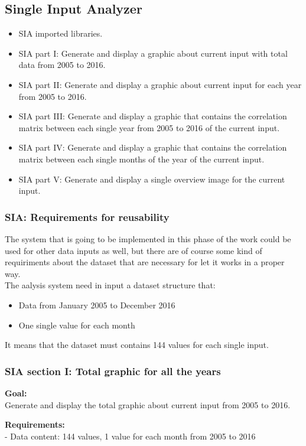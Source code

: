 \newpage
\subsection{Single Input Analyzer}
\begin{itemize}
\item SIA imported libraries.
\item SIA part I: Generate and display a graphic about current input with total data from 2005 to 2016.
\item SIA part II: Generate and display a graphic about current input for each year from 2005 to 2016.
\item SIA part III: Generate and display a graphic that contains the correlation matrix between each single year from 2005 to 2016 of the current input.
\item SIA part IV: Generate and display a graphic that contains the correlation matrix between each single months of the year of the current input.
\item SIA part V: Generate and display a single overview image for the current input.
\end{itemize}

\subsubsection{SIA: Requirements for reusability}
The system that is going to be implemented in this phase of the work could be used for other data inputs as well, but there are of course some kind of requiriments about the dataset that are necessary for let it works in a proper way.\\
The aalysis system need in input a dataset structure that:
\begin{itemize}
\item Data from January 2005 to December 2016
\item One single value for each month
\end{itemize}
It means that the dataset must contains 144 values for each single input.
\newpage

\subsubsection{SIA section I: Total graphic for all the years}
\textbf{Goal:}\\
Generate and display the total graphic about current input from 2005 to 2016.

\textbf{Requirements:}\\
- Data content: 144 values, 1 value for each month from 2005 to 2016

